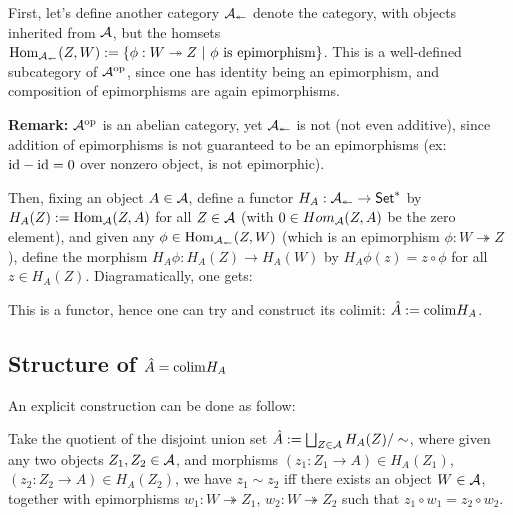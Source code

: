 \documentclass{article}
\begin{document}
\hfil

First, let's define another category $\cal{A}_{\twoheadleftarrow}$ denote the category, with objects inherited from $\cal{A}$, but the homsets $\mathrm{Hom}_{\cal{A}_\twoheadleftarrow}(Z,W):= \{\phi:W\twoheadrightarrow Z\ |\ \phi \text{ is epimorphism}\}$. This is a well-defined subcategory of $\cal{A}^\text{op}$, since one has identity being an epimorphism, and composition of epimorphisms are again epimorphisms.

\hfil

\textbf{Remark:} $\cal{A}^\text{op}$ is an abelian category, yet $\cal{A}_\twoheadleftarrow$ is not (not even additive), since addition of epimorphisms is not guaranteed to be an epimorphisms (ex: $\mathrm{id} - \mathrm{id} = 0$ over nonzero object, is not epimorphic).

\hfil

Then, fixing an object $A\in \cal{A}$, define a functor $H_A:\cal{A}_\twoheadleftarrow\rightarrow \mathsf{Set}^*$ by $H_A(Z) := \mathrm{Hom}_{\cal{A}}(Z,A)$ for all $Z\in\cal{A}$ (with $0\in Hom_{\cal{A}}(Z,A)$ be the zero element), and given any $\phi \in \mathrm{Hom}_{\cal{A}_\twoheadleftarrow}(Z,W)$ (which is an epimorphism $\phi:W\twoheadrightarrow Z$), define the morphism $H_A \phi:H_A(Z)\rightarrow H_A(W)$ by $H_A \phi(z) = z \circ \phi$ for all $z\in H_A(Z)$. Diagramatically, one gets:
\begin{center}
\end{center}
This is a functor, hence one can try and construct its colimit: $\hat{A}:= \mathrm{colim} H_A$.

\hfil

\subsection{Structure of $\hat{A}=\mathrm{colim} H_A$}
An explicit construction can be done as follow: 

Take the quotient of the disjoint union set $\hat{A}:=\bigsqcup_{Z\in \cal{A}}H_A(Z) / \sim$, where given any two objects $Z_1,Z_2\in \cal{A}$, and morphisms $(z_1:Z_1\rightarrow A) \in H_A(Z_1)$, $(z_2:Z_2\rightarrow A)\in H_A(Z_2)$, we have $z_1\sim z_2$ iff there exists an object $W\in\cal{A}$, together with epimorphisms $w_1:W\twoheadrightarrow Z_1$, $w_2:W\twoheadrightarrow Z_2$ such that $z_1\circ w_1 = z_2\circ w_2$. 
\end{document}
